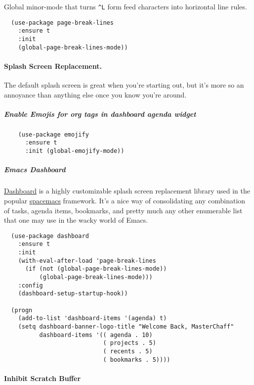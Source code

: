 \documentclass[11pt]{article}
\begin{document}
Global minor-mode that turns \texttt{\textasciicircum{}L} form feed characters into
horizontal line rules.

\begin{verbatim}
  (use-package page-break-lines
    :ensure t
    :init
    (global-page-break-lines-mode))
\end{verbatim}

\paragraph*{Splash Screen Replacement.}
\label{sec:org25762b0}

The default splash screen is great when you're starting out,
but it's more so an annoyance than anything else once you
know you're around.

\subparagraph*{Enable Emojis for org tags in dashboard agenda widget}
\label{sec:orgb9a5189}

\begin{verbatim}
    (use-package emojify
      :ensure t
      :init (global-emojify-mode))
\end{verbatim}

\subparagraph*{Emacs Dashboard}
\label{sec:org34093f7}

\href{https://github.com/rakanalh/emacs-dashboard}{Dashboard} is a highly customizable splash screen
replacement library used in the popular \href{https://github.com/syl20bnr/spacemacs}{spacemacs} framework.
It's a nice way of consolidating any combination of tasks,
agenda items, bookmarks, and pretty much any other enumerable
list that one may use in the wacky world of Emacs.

\begin{verbatim}
  (use-package dashboard
    :ensure t
    :init
    (with-eval-after-load 'page-break-lines
      (if (not (global-page-break-lines-mode))
          (global-page-break-lines-mode)))
    :config
    (dashboard-setup-startup-hook))

  (progn
    (add-to-list 'dashboard-items '(agenda) t)
    (setq dashboard-banner-logo-title "Welcome Back, MasterChaff"
          dashboard-items '(( agenda . 10)
                            ( projects . 5)
                            ( recents . 5)
                            ( bookmarks . 5))))
\end{verbatim}

\paragraph*{Inhibit Scratch Buffer}
\label{sec:orgb833bd1}
\end{document}
